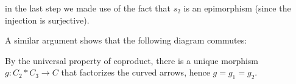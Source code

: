 \documentclass{article}
\def\Z{\mathbb{Z}}
\begin{document}



in the last step we made use of the fact that $s_2$ is an epimorphism (since the injection is surjective).

A similar argument shows that the following diagram commutes:


By the universal property of coproduct, there is a unique morphism $g: C_2 * C_3 \to C$ that factorizes the curved arrows, hence $g = g_1 = g_2$.
\end{document}
